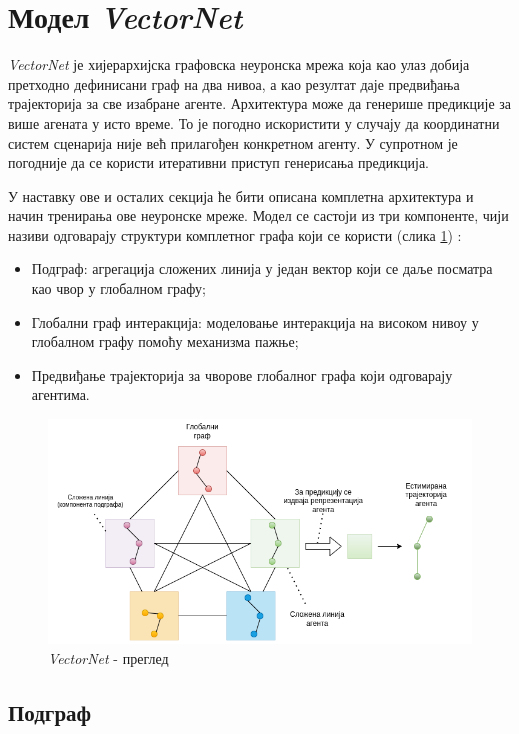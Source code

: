 \documentclass[11pt,oneside]{memoir}
\begin{document}
\section{Модел \textit{VectorNet}}

\textit{VectorNet} је хијерархијска графовска неуронска мрежа која као улаз добија претходно дефинисани граф на два нивоа, а као резултат
даје предвиђања трајекторија за све изабране агенте. Архитектура може да генерише предикције за више агената у исто време. То
је погодно искористити у случају да координатни систем сценарија није већ прилагођен конкретном агенту. У супротном је погодније
да се користи итеративни приступ генерисања предикција.

У наставку ове и осталих секција ће бити описана комплетна архитектура и начин тренирања ове неуронске мреже. Модел се састоји из три компоненте,
чији називи одговарају структури комплетног графа који се користи (слика \ref{vectornet-overview}) \cite{vectornet}:
\begin{itemize}
  \item Подграф: агрегација сложених линија у један вектор који се даље посматра као чвор у глобалном графу;
  \item Глобални граф интеракција: моделовање интеракција на високом нивоу у глобалном графу помоћу механизма пажње;
  \item Предвиђање трајекторија за чворове глобалног графа који одговарају агентима.
\end{itemize}

\begin{figure}[H]
  \centering
  \includegraphics[width=1.0\textwidth]{images/vectornet-overview-Hijearhija.drawio.png}
  \caption{\textit{VectorNet} - преглед \label{vectornet-overview}}
\end{figure}

\subsection{Подграф}
\end{document}

